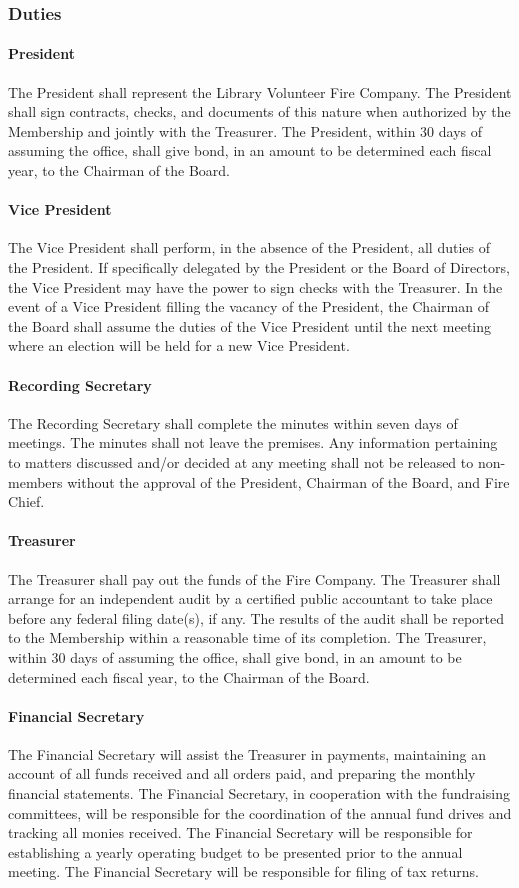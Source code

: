 ﻿\documentclass[12pt,letterpaper]{article}
\begin{document}
\subsubsection{Duties}
\paragraph{President}
The President shall represent the Library Volunteer Fire Company.  The President shall sign contracts, checks, and documents of this nature when authorized by the Membership and jointly with the Treasurer. The President, within 30 days of assuming the office, shall give bond, in an amount to be determined each fiscal year, to the Chairman of the Board.
\paragraph{Vice President}
The Vice President shall perform, in the absence of the President, all duties of the President.  If specifically delegated by the President or the Board of Directors, the Vice President may have the power to sign checks with the Treasurer.  In the event of a Vice President filling the vacancy of the President, the Chairman of the Board shall assume the duties of the Vice President until the next meeting where an election will be held for a new Vice President.
\paragraph{Recording Secretary}
The Recording Secretary shall complete the minutes within seven days of meetings. The minutes shall not leave the premises.  Any information pertaining to matters discussed and/or decided at any meeting shall not be released to non-members without the approval of the President, Chairman of the Board, and Fire Chief.
\paragraph{Treasurer}
The Treasurer shall pay out the funds of the Fire Company.  The Treasurer shall arrange for an independent audit by a certified public accountant to take place before any federal filing date(s), if any. The results of the audit shall be reported to the Membership within a reasonable time of its completion. The Treasurer, within 30 days of assuming the office, shall give bond, in an amount to be determined each fiscal year, to the Chairman of the Board.
\paragraph{Financial Secretary}
The Financial Secretary will assist the Treasurer in payments, maintaining an account of all funds received and all orders paid, and preparing the monthly financial statements.  The Financial Secretary, in cooperation with the fundraising committees, will be responsible for the coordination of the annual fund drives and tracking all monies received.  The Financial Secretary will be responsible for establishing a yearly operating budget to be presented prior to the annual meeting.  The Financial Secretary will be responsible for filing of tax returns.
\end{document}
